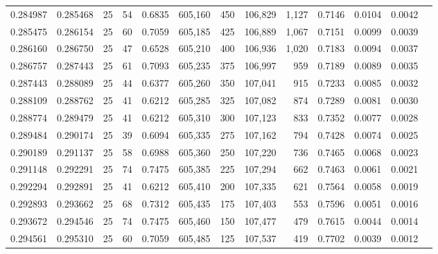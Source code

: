 \begin{tabular}{rrrrrrrrrrrrr}
0.284987 & 0.285468 &    25 &  54 &                                     0.6835 & 605,160 &     450 & 106,829 &   1,127 & 0.7146 & 0.0104 & 0.0042 \\
0.285475 & 0.286154 &    25 &  60 &                                     0.7059 & 605,185 &     425 & 106,889 &   1,067 & 0.7151 & 0.0099 & 0.0039 \\
0.286160 & 0.286750 &    25 &  47 &                                     0.6528 & 605,210 &     400 & 106,936 &   1,020 & 0.7183 & 0.0094 & 0.0037 \\
0.286757 & 0.287443 &    25 &  61 &                                     0.7093 & 605,235 &     375 & 106,997 &     959 & 0.7189 & 0.0089 & 0.0035 \\
0.287443 & 0.288089 &    25 &  44 &                                     0.6377 & 605,260 &     350 & 107,041 &     915 & 0.7233 & 0.0085 & 0.0032 \\
0.288109 & 0.288762 &    25 &  41 &                                     0.6212 & 605,285 &     325 & 107,082 &     874 & 0.7289 & 0.0081 & 0.0030 \\
0.288774 & 0.289479 &    25 &  41 &                                     0.6212 & 605,310 &     300 & 107,123 &     833 & 0.7352 & 0.0077 & 0.0028 \\
0.289484 & 0.290174 &    25 &  39 &                                     0.6094 & 605,335 &     275 & 107,162 &     794 & 0.7428 & 0.0074 & 0.0025 \\
0.290189 & 0.291137 &    25 &  58 &                                     0.6988 & 605,360 &     250 & 107,220 &     736 & 0.7465 & 0.0068 & 0.0023 \\
0.291148 & 0.292291 &    25 &  74 &                                     0.7475 & 605,385 &     225 & 107,294 &     662 & 0.7463 & 0.0061 & 0.0021 \\
0.292294 & 0.292891 &    25 &  41 &                                     0.6212 & 605,410 &     200 & 107,335 &     621 & 0.7564 & 0.0058 & 0.0019 \\
0.292893 & 0.293662 &    25 &  68 &                                     0.7312 & 605,435 &     175 & 107,403 &     553 & 0.7596 & 0.0051 & 0.0016 \\
0.293672 & 0.294546 &    25 &  74 &                                     0.7475 & 605,460 &     150 & 107,477 &     479 & 0.7615 & 0.0044 & 0.0014 \\
0.294561 & 0.295310 &    25 &  60 &                                     0.7059 & 605,485 &     125 & 107,537 &     419 & 0.7702 & 0.0039 & 0.0012 \\

\end{tabular}
